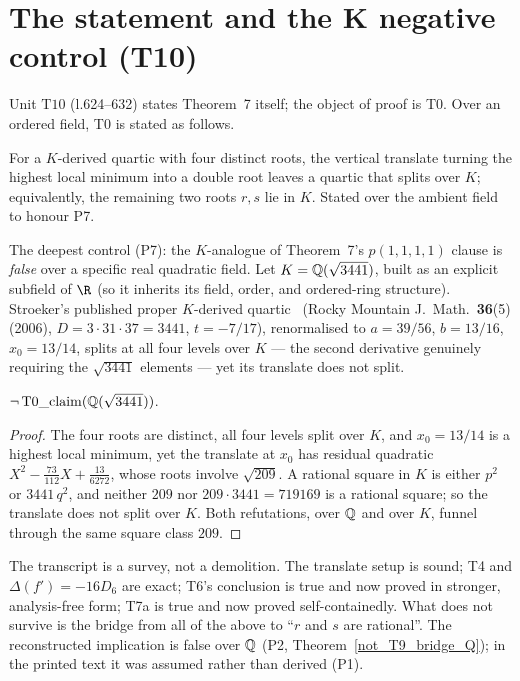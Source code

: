 \section{The statement and the K negative control (T10)}

Unit $\mathrm{T10}$ (l.624--632) states Theorem~7 itself; the object of proof is T0.
Over an ordered field, T0 is stated as follows.

\begin{definition}\label{T0_claim}\leanok
{}
For a $K$-derived quartic with four distinct roots, the vertical translate turning the
highest local minimum into a double root leaves a quartic that splits over $K$;
equivalently, the remaining two roots $r,s$ lie in $K$.  Stated over the ambient field
to honour P7.
\end{definition}

The deepest control (P7): the $K$-analogue of Theorem~7's $p(1,1,1,1)$ clause is
\emph{false} over a specific real quadratic field.  Let $K=\Q(\sqrt{3441})$, built as an
explicit subfield of $\R$ (so it inherits its field, order, and ordered-ring structure).
Stroeker's published proper $K$-derived quartic~\cite{Stroeker2006}
(Rocky Mountain J.\ Math.\ \textbf{36}(5) (2006), $D=3\cdot 31\cdot 37=3441$, $t=-7/17$),
renormalised to $a=39/56$, $b=13/16$,
$x_{0}=13/14$, splits at all four levels over $K$ --- the second derivative genuinely
requiring the $\sqrt{3441}$ elements --- yet its translate does not split.

\begin{theorem}[P7: the statement fails over $K=\Q(\sqrt{3441})$]\label{not_T0_claim_K}\leanok
{}
$\neg\,\mathrm{T0\_claim}(\mathbb{Q}(\sqrt{3441}))$.
\end{theorem}
\begin{proof}\leanok
The four roots are distinct, all four levels split over $K$, and $x_{0}=13/14$ is a
highest local minimum, yet the translate at $x_{0}$ has residual quadratic
$X^{2}-\tfrac{73}{112}X+\tfrac{13}{6272}$, whose roots involve $\sqrt{209}$.  A rational
square in $K$ is either $p^{2}$ or $3441\,q^{2}$, and neither $209$ nor
$209\cdot 3441=719169$ is a rational square; so the translate does not split over $K$.
Both refutations, over $\mathbb{Q}$ and over $K$, funnel through the same square class $209$.
\end{proof}

The transcript is a survey, not a demolition.  The translate setup is sound; T4 and
$\Delta(f')=-16D_{6}$ are exact; T6's conclusion is true and now proved in stronger,
analysis-free form; T7a is true and now proved self-containedly.  What does not survive
is the bridge from all of the above to ``$r$ and $s$ are rational''.  The reconstructed
implication is false over $\mathbb{Q}$ (P2, Theorem~\ref{not_T9_bridge_Q}); in the printed text
it was assumed rather than derived (P1).

